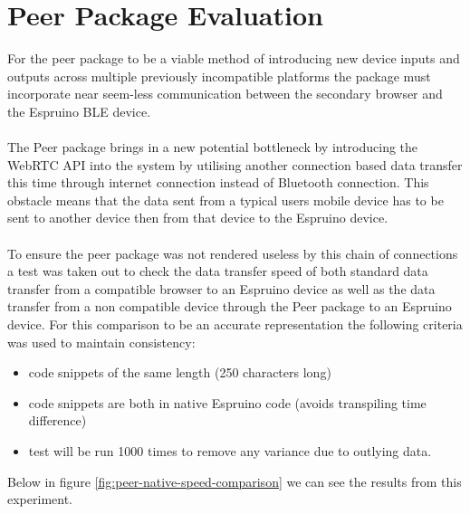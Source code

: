 \documentclass{l4proj}
\begin{document}
\section{Peer Package Evaluation}

For the peer package to be a viable method of introducing new device inputs and outputs across multiple previously incompatible platforms the package must incorporate near seem-less communication between the secondary browser and the Espruino BLE device.
\\ \\
The Peer package brings in a new potential bottleneck by introducing the WebRTC API into the system by utilising another connection based data transfer this time through internet connection instead of Bluetooth connection. This obstacle means that the data sent from a typical users mobile device has to be sent to another device then from that device to the Espruino device.
\\ \\ 
To ensure the peer package was not rendered useless by this chain of connections a test was taken out to check the data transfer speed of both standard data transfer from a compatible browser to an Espruino device as well as the data transfer from a non compatible device through the Peer package to an Espruino device. For this comparison to be an accurate representation the following criteria was used to maintain consistency:

\begin{itemize}
    \item code snippets of the same length (250 characters long)
    \item code snippets are both in native Espruino code (avoids transpiling time difference)
    \item test will be run 1000 times to remove any variance due to outlying data.
\end{itemize}

Below in figure \ref{fig:peer-native-speed-comparison} we can see the results from this experiment.
\end{document}
